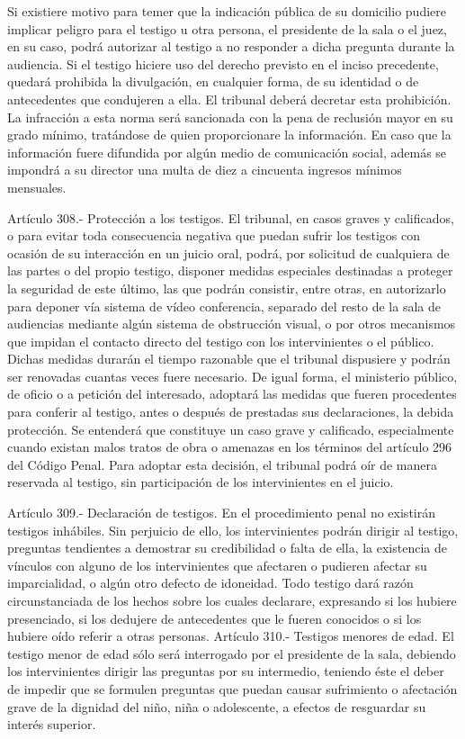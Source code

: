     Si existiere motivo para temer que la indicación pública de su domicilio pudiere implicar peligro para el testigo u otra persona, el presidente de la sala o el juez, en su caso, podrá autorizar al testigo a no responder a dicha pregunta durante la audiencia.
    Si el testigo hiciere uso del derecho previsto en el inciso precedente, quedará prohibida la divulgación, en cualquier forma, de su identidad o de antecedentes que condujeren a ella. El tribunal deberá decretar esta prohibición. La infracción a esta norma será sancionada con la pena de reclusión mayor en su grado mínimo, tratándose de quien proporcionare la información. En caso que la información fuere difundida por algún medio de comunicación social, además se impondrá a su director una multa de diez a cincuenta ingresos mínimos mensuales.

    Artículo 308.- Protección a los testigos. El tribunal, en casos graves y calificados, o para evitar toda consecuencia negativa que puedan sufrir los testigos con ocasión de su interacción en un juicio oral, podrá, por solicitud de cualquiera de las partes o del propio testigo, disponer medidas especiales destinadas a proteger la seguridad de este último, las que podrán consistir, entre otras, en autorizarlo para deponer vía sistema de vídeo conferencia, separado del resto de la sala de audiencias mediante algún sistema de obstrucción visual, o por otros mecanismos que impidan el contacto directo del testigo con los intervinientes o el público. Dichas medidas durarán el tiempo razonable que el tribunal dispusiere y podrán ser renovadas cuantas veces fuere necesario.
    De igual forma, el ministerio público, de oficio o a petición del interesado, adoptará las medidas que fueren procedentes para conferir al testigo, antes o después de prestadas sus declaraciones, la debida protección.
    Se entenderá que constituye un caso grave y calificado, especialmente cuando existan malos tratos de obra o amenazas en los términos del artículo 296 del Código Penal. Para adoptar esta decisión, el tribunal podrá oír de manera reservada al testigo, sin participación de los intervinientes en el juicio.



    Artículo 309.- Declaración de testigos. En el procedimiento penal no existirán testigos inhábiles. Sin perjuicio de ello, los intervinientes podrán dirigir al testigo, preguntas tendientes a demostrar su credibilidad o falta de ella, la existencia de vínculos con alguno de los intervinientes que afectaren o pudieren afectar su imparcialidad, o algún otro defecto de idoneidad.
    Todo testigo dará razón circunstanciada de los hechos sobre los cuales declarare, expresando si los hubiere presenciado, si los dedujere de antecedentes que le fueren conocidos o si los hubiere oído referir a otras personas.
    Artículo 310.- Testigos menores de edad. El testigo menor de edad sólo será interrogado por el presidente de la sala, debiendo los intervinientes dirigir las preguntas por su intermedio, teniendo éste el deber de impedir que se formulen preguntas que puedan causar sufrimiento o afectación grave de la dignidad del niño, niña o adolescente, a efectos de resguardar su interés superior.



